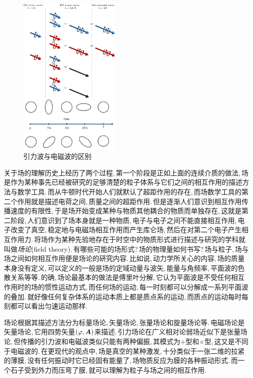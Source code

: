 \begin{figure}
\vspace{-0.4cm}
\centering
\includegraphics[width=5cm]{image/6-1-2.png}
\caption{引力波与电磁波的区别}
\end{figure}
关于场的理解历史上经历了两个过程.\,第一个阶段是正如上面的连续介质的做法,\,场是作为某种事先已经被研究的足够清楚的粒子体系与它们之间的相互作用的描述方法与数学工具.\,而从牛顿时代开始人们就默认了超距作用的存在,\,而场数学工具的第二个作用就是描述电荷之间,\,质量之间的超距作用.\,但是逐渐人们意识到相互作用传播速度的有限性,\,于是场开始变成某种与物质其他耦合的物质而单独存在,\,这就是第二阶段,\,人们意识到了场本身就是一种物质,\,电子与电子之间不能直接相互作用,\,电子改变了真空,\,稳定地与电磁场相互作用而产生库仑场,\,然后在对第二个电子产生相互作用力.\,将场作为某种先验地存在于时空中的物质形式进行描述与研究的学科就叫做\emph{场论}(field theory).\,有哪些可能的场形式?\,场的物理量如何书写?\,场与粒子,\,场与场之间如何相互作用便是场论的研究内容.\,比如说,\,动力学所关心的内容,\,场的质量本身没有定义,\,可以定义的一般是场的定域动量与波矢,\,能量与角频率,\,平面波的色散关系等等.\,的确,\,场论最基本的做法是傅里叶分解,\,它认为平面波是不受任何相互作用时的场的惯性运动方式,\,而任何场的运动,\,每一时刻都可以分解成一系列平面波的叠加.\,就好像任何复杂体系的运动本质上都是质点系的运动,\,而质点的运动每时每刻都可以看出匀速运动那样.


场论根据其描述方法分为标量场论,\,矢量场论,\,张量场论和旋量场论等.\,电磁场论是矢量场论,\,它用四势矢量$(\varphi,\boldsymbol{A})$来描述.\,引力场论在广义相对论弱场近似下是张量场论,\,但传播的引力波和电磁波类似只能有两种偏振,\,其模式为$+$型和$\times$型,\,这又是不同于电磁波的.\,在更现代的观点中,\,场是真空的某种激发,\,十分类似于一张二维的拉紧的薄膜,\,没有任何振动时它已经固有能量了,\,场物质反应为膜的各种振动形式.\,而一个石子受到外力而压弯了膜,\,就可以理解为粒子与场之间的相互作用.



